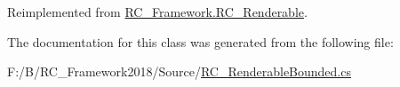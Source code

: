 Reimplemented from \mbox{\hyperlink{class_r_c___framework_1_1_r_c___renderable_a5745bedc7ba0587aa1e1d8563c357228}{R\+C\+\_\+\+Framework.\+R\+C\+\_\+\+Renderable}}.



The documentation for this class was generated from the following file\+:\begin{DoxyCompactItemize}
\item 
F\+:/\+B/\+R\+C\+\_\+\+Framework2018/\+Source/\mbox{\hyperlink{_r_c___renderable_bounded_8cs}{R\+C\+\_\+\+Renderable\+Bounded.\+cs}}\end{DoxyCompactItemize}
